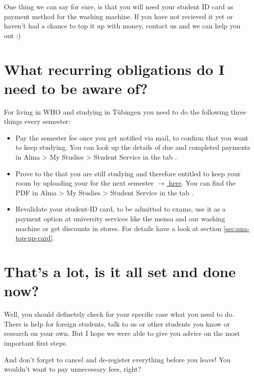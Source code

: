 One thing we can say for sure, is that you will need your student ID card as payment method for the washing machine. If you have not recieved it yet or haven't had a chance to top it up with money, contact us and we can help you out :)

\section{What recurring obligations do I need to be aware of?}

For living in WHO and studying in Tübingen you need to do the following three things every semester:

\begin{itemize}
    \item Pay the semester fee once you get notified via mail, to confirm that you want to keep studying. You can look up the details of due and completed payments in Alma > My Studies > Student Service in the tab .
    
    \item Prove to the  that you are still studying and therefore entitled to keep your room by uploading your  for the next semester \href{https://tl1.eu/SWTUE/#maintenance/upload}{$\rightarrow{}$ here}. You can find the PDF in Alma > My Studies > Student Service in the tab .

    \item Revalidate your student-ID card, to be admitted to exams, use it as a payment option at university services like the mensa and our washing machine or get discounts in stores. For details have a look at section \ref{sec:qna-top-up-card}.
\end{itemize}

\section{That's a lot, is it all set and done now?}

Well, you should definetely check for your specific case what you need to do. There is help for foreign students, talk to us or other students you know or research on your own. But I hope we were able to give you advice on the most important first steps.

And don't forget to cancel and de-register everything before you leave! You wouldn't want to pay unnecessary fees, right?